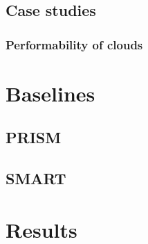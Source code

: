 \subsection{Case studies}

\subsubsection{Performability of clouds}

\section{Baselines}

\subsection{PRISM}

\subsection{SMART}

\section{Results}
\label{sec:evaluation:results}